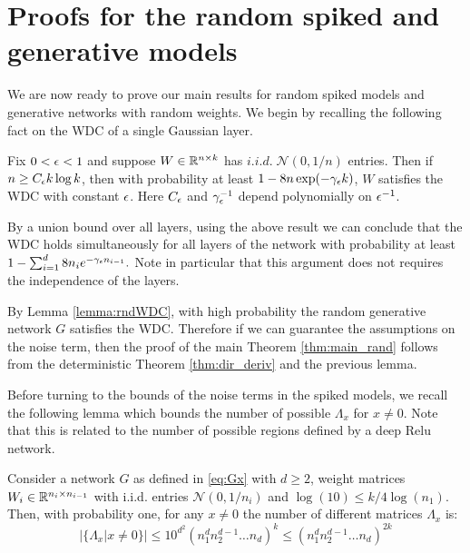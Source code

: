 \section{Proofs for the random spiked and generative models}\label{sec:rand_proofs}

We are now ready to prove our main results for random spiked models and generative networks with random weights. We begin by recalling the following fact on the WDC of a single Gaussian layer. 

\begin{lemma}\label{lemma:rndWDC}
	Fix $0 < \epsilon < 1$ and suppose $W \in \mathbb{R}^{n \times k}$ has $i.i.d. \;\mathcal{N}(0,1/n)$ entries. Then if $n \geq C_\epsilon k \log k$, then with probability at least $1 - 8 n \exp(-\gamma_\epsilon k)$, $W$ satisfies the WDC with constant $\epsilon$. Here $C_\epsilon$ and $\gamma_\epsilon^{-1}$ depend 
	polynomially on $\epsilon^{-1}$.
\end{lemma}

By a union bound over all layers, using the above result we can 
conclude that the WDC holds simultaneously for all layers of the network with probability at least
$    1  - \sum_{i=1}^d 8 n_i e^{- \gamma_\epsilon n_{i-1}}.$
Note in particular that this argument does not requires the independence of the layers.

By Lemma \ref{lemma:rndWDC}, with high probability 
the  random generative network $G$ satisfies the WDC. Therefore if we can guarantee the assumptions on the noise term, then the proof of the main Theorem \ref{thm:main_rand}
follows from the deterministic Theorem \ref{thm:dir_deriv} and the previous lemma. 

Before turning to the bounds of the noise terms in the spiked models,
we recall the following lemma which bounds the number of possible $\Lambda_x$ for $x\neq 0$. Note that this is related to the number of possible regions defined by a deep Relu network.

\begin{lemma}\label{lemma:NLx}
	Consider a network $G$ as defined in \eqref{eq:Gx} with $d \geq 2$, weight matrices $W_i \in \mathbb{R}^{n_i \times n_{i-1}}$ with i.i.d. entries $\mathcal{N}(0,1/n_i)$ and $\log(10) \leq k/4 \log(n_1)$. Then, with probability one, for any $x \neq 0$ the number of different matrices $\Lambda_x$ is:
	\[
	| \{ \Lambda_x | x \neq 0 \} | \leq 10^{d^2} (n_1^d n_2^{d-1} \dots n_d )^k \leq (n_1^d n_2^{d-1} \dots n_d)^{2 k}
	\] 
\end{lemma}

